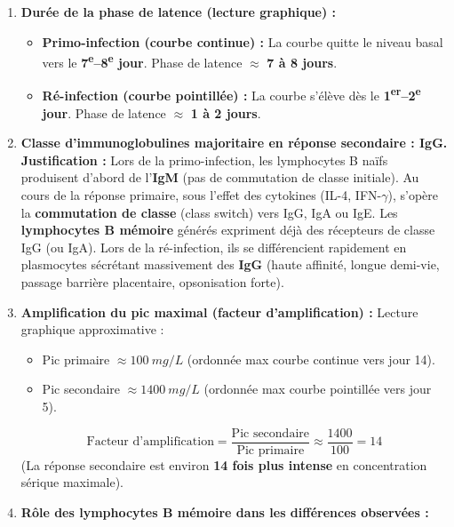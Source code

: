 \documentclass[11pt]{article}
\begin{document}
\begin{corrige}
\begin{enumerate}
    \item \textbf{Durée de la phase de latence (lecture graphique) :}
    \begin{itemize}
        \item \textbf{Primo-infection (courbe continue) :} La courbe quitte le niveau basal vers le \textbf{7\textsuperscript{e}--8\textsuperscript{e} jour}. Phase de latence $\approx$ \textbf{7 à 8 jours}.
        \item \textbf{Ré-infection (courbe pointillée) :} La courbe s'élève dès le \textbf{1\textsuperscript{er}--2\textsuperscript{e} jour}. Phase de latence $\approx$ \textbf{1 à 2 jours}.
    \end{itemize}
    \item \textbf{Classe d'immunoglobulines majoritaire en réponse secondaire : \textbf{IgG}.}
    \textbf{Justification :} Lors de la primo-infection, les lymphocytes B naïfs produisent d'abord de l'\textbf{IgM} (pas de commutation de classe initiale). Au cours de la réponse primaire, sous l'effet des cytokines (IL-4, IFN-$\gamma$), s'opère la \textbf{commutation de classe} (class switch) vers IgG, IgA ou IgE. Les \textbf{lymphocytes B mémoire} générés expriment déjà des récepteurs de classe IgG (ou IgA). Lors de la ré-infection, ils se différencient rapidement en plasmocytes sécrétant massivement des \textbf{IgG} (haute affinité, longue demi-vie, passage barrière placentaire, opsonisation forte).
    \item \textbf{Amplification du pic maximal (facteur d'amplification) :}
    Lecture graphique approximative :
    \begin{itemize}
        \item Pic primaire $\approx \SI{100}{mg/L}$ (ordonnée max courbe continue vers jour 14).
        \item Pic secondaire $\approx \SI{1400}{mg/L}$ (ordonnée max courbe pointillée vers jour 5).
    \end{itemize}
    \[
    \text{Facteur d'amplification} = \frac{\text{Pic secondaire}}{\text{Pic primaire}} \approx \frac{1400}{100} = 14
    \]
    (La réponse secondaire est environ \textbf{14 fois plus intense} en concentration sérique maximale).
    \item \textbf{Rôle des lymphocytes B mémoire dans les différences observées :}
    \begin{itemize}

\end{itemize}
\end{enumerate}
\end{corrige}
\end{document}
